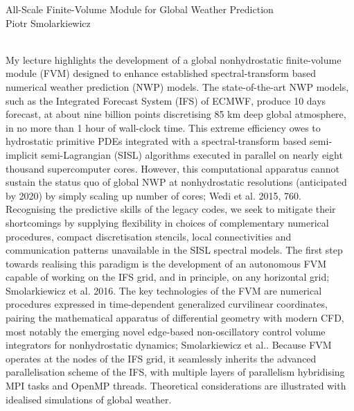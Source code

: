     {  
			{All-Scale Finite-Volume Module for Global Weather Prediction} \\
    \normalfont\small Piotr Smolarkiewicz }
    
    {  \\    
    } 
      {  } 
	\vspace{1cm} 
	My lecture highlights the development of a global nonhydrostatic finite-volume module (FVM) designed to enhance established spectral-transform based numerical weather prediction (NWP) models. The state-of-the-art NWP models, such as the Integrated Forecast System (IFS) of ECMWF, produce 10 days forecast, at about nine billion points discretising 85 km deep global atmosphere, in no more than 1 hour of wall-clock time. This extreme efficiency owes to hydrostatic primitive PDEs integrated with a spectral-transform based semi-implicit semi-Lagrangian (SISL) algorithms executed in parallel on nearly eight thousand supercomputer cores. However, this computational apparatus cannot sustain the status quo of global NWP at nonhydrostatic resolutions (anticipated by 2020) by simply scaling up number of cores; Wedi et al. 2015, 760. Recognising the predictive skills of the legacy codes, we seek to mitigate their shortcomings by supplying flexibility in choices of complementary numerical procedures, compact discretisation stencils, local connectivities and communication patterns unavailable in the SISL spectral models. The first step towards realising this paradigm is the development of an autonomous FVM capable of working on the IFS grid, and in principle, on any horizontal grid; Smolarkiewicz et al. 2016. The key technologies of the FVM are numerical procedures expressed in time-dependent generalized curvilinear coordinates, pairing the mathematical apparatus of differential geometry with modern CFD, most notably the emerging novel edge-based non-oscillatory control volume integrators for nonhydrostatic dynamics; Smolarkiewicz et al.. Because FVM operates at the nodes of the IFS grid, it seamlessly inherits the advanced parallelisation scheme of the IFS, with multiple layers of parallelism hybridising MPI tasks and OpenMP threads. Theoretical considerations are illustrated with idealised simulations of global weather.
	
         
    \vspace{.5cm}
    \newpage
    
